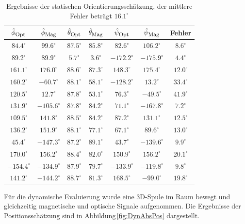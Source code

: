 \begin{table}[h]
  \centering
  \begin{tabular}{|c| c| c| c| c| c| c|}
  \hline 
  \rowcolor{gray}$\hat{\phi}_{\textrm{\footnotesize{Opt}}}$ & $\hat{\phi}_{\textrm{\footnotesize{Mag}}}$ & $\hat{\theta}_{\textrm{\footnotesize{Opt}}}$ & $\hat{\theta}_{\textrm{\footnotesize{Mag}}}$ & $\hat{\psi}_{\textrm{\footnotesize{Opt}}}$ & $\hat{\psi}_{\textrm{\footnotesize{Mag}}}$ & Fehler \\ 
  \hline
  $84.4^\circ$ & $99.6^\circ$ & $87.5^\circ$  & $85.8^\circ$ & $82.6^\circ$ & $106.2^\circ$ & $8.6^\circ$ \\ 
  \hline
  \rowcolor{lightgray}$89.2^\circ$ & $89.9^\circ$ & $5.7^\circ$   & $3.6^\circ$ & $-172.2^\circ$& $-175.9^\circ$ & $4.4^\circ$ \\
  \hline
  $161.1^\circ$ & $176.0^\circ$ & $88.6^\circ$  & $87.3^\circ$ & $148.3^\circ$ & $175.4^\circ$ & $12.0^\circ$\\
  \hline
  \rowcolor{lightgray}$160.2^\circ$ & $-60.7^\circ$ & $88.1^\circ$ & $58.1^\circ$ & $-128.2^\circ$ & $13.2^\circ$ & $33.4^\circ$ \\
  \hline
  $120.5^\circ$ & $12.7^\circ$ & $87.8^\circ$ & $53.1^\circ$ & $76.3^\circ$ & $-49.5^\circ$ & $41.9^\circ$\\ 
  \hline
  \rowcolor{lightgray}$131.9^\circ$ & $-105.6^\circ$ & $87.8^\circ$ & $84.2^\circ$ & $71.1^\circ$ & $-167.8^\circ$& $7.2^\circ$  \\ 
  \hline
  $109.5^\circ$ & $141.8^\circ$ & $88.5^\circ$  & $84.2^\circ$ & $87.2^\circ$ & $131.1^\circ$ & $12.5^\circ$ \\
  \hline
  \rowcolor{lightgray}$136.2^\circ$ & $151.9^\circ$ & $88.1^\circ$ & $77.1^\circ$ & $67.1^\circ$ & $89.6^\circ$ & $13.0^\circ$ \\
  \hline
  $45.4^\circ$ & $-147.3^\circ$ & $87.2^\circ$ & $89.1^\circ$ & $43.7^\circ$ & $-139.6^\circ$ & $9.9^\circ$ \\
  \hline
  \rowcolor{lightgray}$170.0^\circ$ & $156.2^\circ$ & $88.4^\circ$  & $82.0^\circ$ & $150.9^\circ$ & $156.2^\circ$ & $20.1^\circ$ \\ 
  \hline
  $-154.4^\circ$ & $-134.9^\circ$ & $87.9^\circ$  & $79.7^\circ$ & $-133.9^\circ $ & $-119.8^\circ$ & $9.8^\circ$ \\ 
  \hline
  \rowcolor{lightgray}$141.2^\circ$ & $-144.2^\circ$ & $88.7^\circ$ & $81.3^\circ$ & $168.5^\circ$ & $-99.0^\circ$ & $19.8^\circ$ \\
  \hline
  \end{tabular}
  \caption{Ergebnisse der statischen Orientierungsschätzung, der mittlere Fehler beträgt $16.1^\circ$ }
  \label{tab:ErgebnisseAbsOri}
\end{table}
Für die dynamische Evaluierung wurde eine 3D-Spule im Raum bewegt und gleichzeitig magnetische und optische Signale aufgenommen. Die Ergebnisse der Positionsschätzung sind in Abbildung\,\ref{fig:DynAbsPos} dargestellt. 

